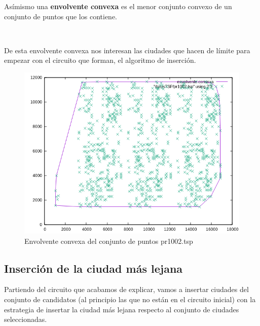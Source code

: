 \documentclass{article}
\begin{document}
	Asímismo una \textbf{envolvente convexa} es el menor conjunto convexo de un conjunto de puntos que los contiene.
	
	\
	
	De esta envolvente convexa nos interesan las ciudades que hacen de límite para empezar con el circuito que forman, el algoritmo de inserción.
	
	\begin{figure}[H]
		\centering
		\includegraphics[totalheight=8cm]{img/envolvente_convexa}
		\caption{Envolvente convexa del conjunto de puntos pr1002.tsp}
		\label{fig:envolvente_convexa}
	\end{figure}
	\subsection{Inserción de la ciudad más lejana}
	Partiendo del circuito que acabamos de explicar, vamos a insertar ciudades del conjunto de candidatos (al principio las que no están en el circuito inicial) con la estrategia de insertar la ciudad más lejana respecto al conjunto de ciudades seleccionadas.
	
	\
	
\end{document}
